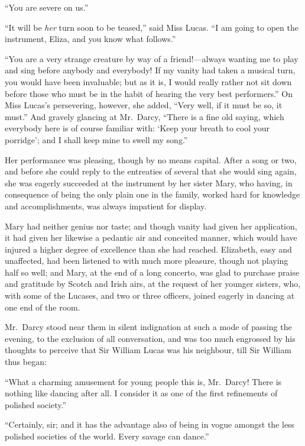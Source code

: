 ``You are severe on us.''

``It will be \emph{her} turn soon to be teased,'' said Miss Lucas.  ``I
am going to open the instrument, Eliza, and you know what
follows.''

``You are a very strange creature by way of a friend!---always
wanting me to play and sing before anybody and everybody!
If my vanity had taken a musical turn, you would have been
invaluable; but as it is, I would really rather not sit down
before those who must be in the habit of hearing the very best
performers.''  On Miss Lucas's persevering, however, she added,
``Very well, if it must be so, it must.''  And gravely glancing at
Mr.\ Darcy, ``There is a fine old saying, which everybody here is of
course familiar with: `Keep your breath to cool your porridge';
and I shall keep mine to swell my song.''

Her performance was pleasing, though by no means capital.
After a song or two, and before she could reply to the entreaties
of several that she would sing again, she was eagerly succeeded
at the instrument by her sister Mary, who having, in consequence
of being the only plain one in the family, worked hard for
knowledge and accomplishments, was always impatient for
display.

Mary had neither genius nor taste; and though vanity had given
her application, it had given her likewise a pedantic air and
conceited manner, which would have injured a higher degree of
excellence than she had reached.  Elizabeth, easy and unaffected,
had been listened to with much more pleasure, though not
playing half so well; and Mary, at the end of a long concerto,
was glad to purchase praise and gratitude by Scotch and Irish
airs, at the request of her younger sisters, who, with some of the
Lucases, and two or three officers, joined eagerly in dancing at
one end of the room.

Mr.\ Darcy stood near them in silent indignation at such a mode
of passing the evening, to the exclusion of all conversation, and
was too much engrossed by his thoughts to perceive that Sir
William Lucas was his neighbour, till Sir William thus began:

``What a charming amusement for young people this is, Mr.\ Darcy!
There is nothing like dancing after all.  I consider it as one
of the first refinements of polished society.''

``Certainly, sir; and it has the advantage also of being in vogue
amongst the less polished societies of the world.  Every savage
can dance.''

